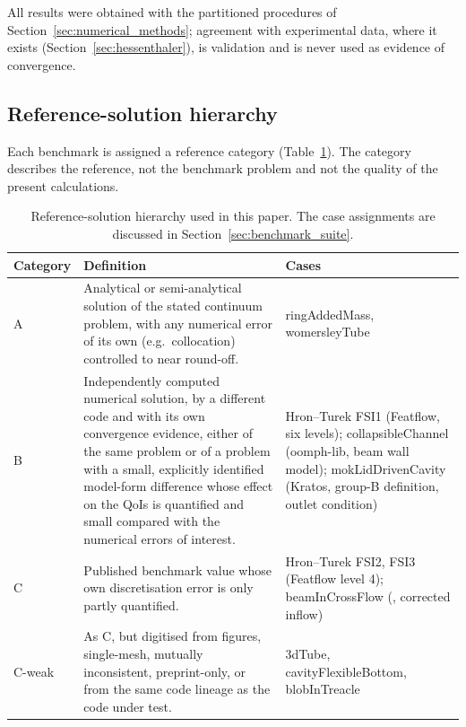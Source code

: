 All results were obtained with the partitioned procedures of Section~\ref{sec:numerical_methods}; agreement with experimental data, where it exists (Section~\ref{sec:hessenthaler}), is validation and is never used as evidence of convergence.

\subsection{Reference-solution hierarchy}\label{sec:ref_hierarchy}

Each benchmark is assigned a reference category (Table~\ref{tab:ref_hierarchy}).
The category describes the reference, not the benchmark problem and not the quality of the present calculations.

\begin{table}[htbp]
	\centering
	\small
	\setlength{\tabcolsep}{4pt}
	\caption{Reference-solution hierarchy used in this paper. The case assignments are discussed in Section~\ref{sec:benchmark_suite}.}
	\label{tab:ref_hierarchy}
	\begin{tabular}{p{1.4cm}p{7.0cm}p{5.0cm}}
		\toprule
		Category & Definition & Cases \\
		\midrule
		A & Analytical or semi-analytical solution of the stated continuum problem, with any numerical error of its own (e.g.\ collocation) controlled to near round-off. & ringAddedMass, womersleyTube \\
		B & Independently computed numerical solution, by a different code and with its own convergence evidence, either of the same problem or of a problem with a small, explicitly identified model-form difference whose effect on the QoIs is quantified and small compared with the numerical errors of interest. & Hron--Turek FSI1 (Featflow, six levels); collapsibleChannel (oomph-lib, beam wall model); mokLidDrivenCavity (Kratos, group-B definition, outlet condition) \\
		C & Published benchmark value whose own discretisation error is only partly quantified. & Hron--Turek FSI2, FSI3 (Featflow level 4); beamInCrossFlow (\citet{Richter2012}, corrected inflow) \\
		C-weak & As C, but digitised from figures, single-mesh, mutually inconsistent, preprint-only, or from the same code lineage as the code under test. & 3dTube, cavityFlexibleBottom, blobInTreacle \\
		\bottomrule
	\end{tabular}
\end{table}


